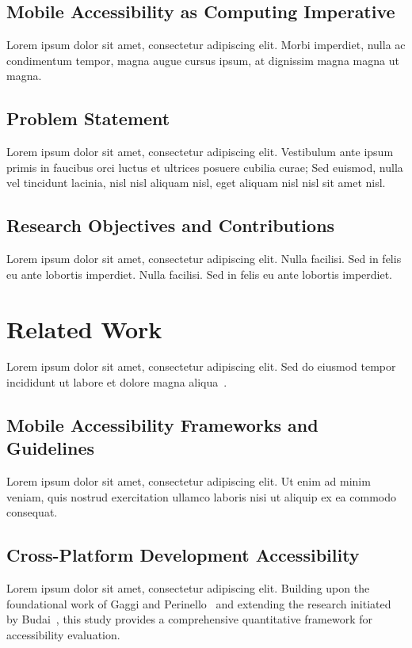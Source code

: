 \documentclass[sigconf]{acmart} %
\begin{document}
\subsection{Mobile Accessibility as Computing Imperative}
Lorem ipsum dolor sit amet, consectetur adipiscing elit. Morbi imperdiet, nulla ac condimentum tempor, magna augue cursus ipsum, at dignissim magna magna ut magna.

\subsection{Problem Statement}
Lorem ipsum dolor sit amet, consectetur adipiscing elit. Vestibulum ante ipsum primis in faucibus orci luctus et ultrices posuere cubilia curae; Sed euismod, nulla vel tincidunt lacinia, nisl nisl aliquam nisl, eget aliquam nisl nisl sit amet nisl.

\subsection{Research Objectives and Contributions}
Lorem ipsum dolor sit amet, consectetur adipiscing elit. Nulla facilisi. Sed in felis eu ante lobortis imperdiet. Nulla facilisi. Sed in felis eu ante lobortis imperdiet.

\section{Related Work}
\label{sec:related-work}

Lorem ipsum dolor sit amet, consectetur adipiscing elit. Sed do eiusmod tempor incididunt ut labore et dolore magna aliqua~\cite{gaggi2024accessibility,budai2024mobile}.

\subsection{Mobile Accessibility Frameworks and Guidelines}
Lorem ipsum dolor sit amet, consectetur adipiscing elit. Ut enim ad minim veniam, quis nostrud exercitation ullamco laboris nisi ut aliquip ex ea commodo consequat.

\subsection{Cross-Platform Development Accessibility}
Lorem ipsum dolor sit amet, consectetur adipiscing elit. Building upon the foundational work of Gaggi and Perinello~\cite{gaggi2024accessibility} and extending the research initiated by Budai~\cite{budai2024mobile}, this study provides a comprehensive quantitative framework for accessibility evaluation.
\end{document}
